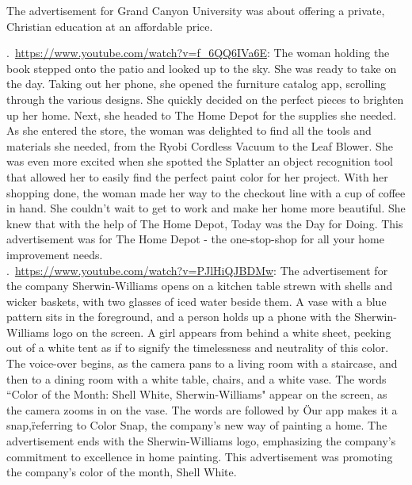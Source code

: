 \documentclass[hidelinks,11pt,a4paper]{report}
\begin{document}
    The advertisement for Grand Canyon University was about offering a private, Christian education at an affordable price.


    .~\url{https://www.youtube.com/watch?v=f_6QQ6IVa6E}: The woman holding the book stepped onto the patio and looked up to the sky. She was ready to take on the day. Taking out her phone, she opened the furniture catalog app, scrolling through the various designs. She quickly decided on the perfect pieces to brighten up her home. Next, she headed to The Home Depot for the supplies she needed. As she entered the store, the woman was delighted to find all the tools and materials she needed, from the Ryobi Cordless Vacuum to the Leaf Blower. She was even more excited when she spotted the Splatter an object recognition tool that allowed her to easily find the perfect paint color for her project. With her shopping done, the woman made her way to the checkout line with a cup of coffee in hand. She couldn't wait to get to work and make her home more beautiful. She knew that with the help of The Home Depot, Today was the Day for Doing. This advertisement was for The Home Depot - the one-stop-shop for all your home improvement needs. \\


    

    .~\url{https://www.youtube.com/watch?v=PJlHiQJBDMw}: The advertisement for the company Sherwin-Williams opens on a kitchen table strewn with shells and wicker baskets, with two glasses of iced water beside them. A vase with a blue pattern sits in the foreground, and a person holds up a phone with the Sherwin-Williams logo on the screen. A girl appears from behind a white sheet, peeking out of a white tent as if to signify the timelessness and neutrality of this color. The voice-over begins, as the camera pans to a living room with a staircase, and then to a dining room with a white table, chairs, and a white vase. The words ``Color of the Month: Shell White, Sherwin-Williams" appear on the screen, as the camera zooms in on the vase. The words are followed by \"Our app makes it a snap,\" referring to Color Snap, the company's new way of painting a home. The advertisement ends with the Sherwin-Williams logo, emphasizing the company's commitment to excellence in home painting. This advertisement was promoting the company's color of the month, Shell White. \\
\end{document}
